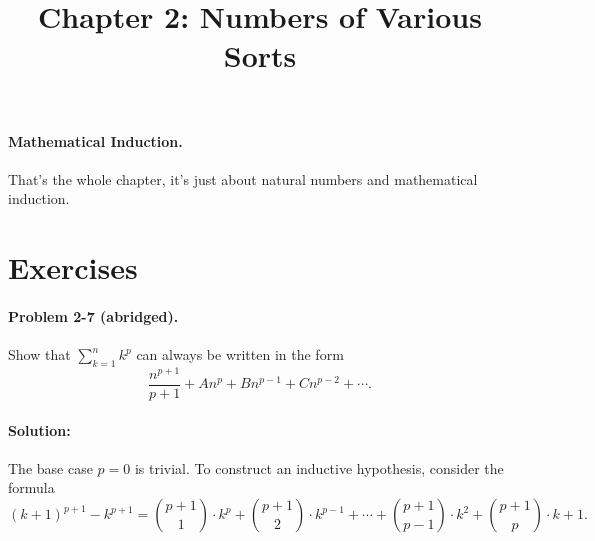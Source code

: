 \documentclass{article}
\begin{document}
\title{Chapter 2: Numbers of Various Sorts}
\maketitle

\paragraph{Mathematical Induction.} That's the whole chapter, it's just about
natural numbers and mathematical induction.

\section*{Exercises}

\paragraph{Problem 2-7 (abridged).} Show that $\sum^n_{k=1} k^p$ can always be
written in the form \begin{equation*}
  \frac{n^{p+1}}{p + 1} + An^p + Bn^{p-1} + Cn^{p-2} + \cdots.
\end{equation*}

\paragraph{Solution:} The base case $p = 0$ is trivial. To construct an
inductive hypothesis, consider the formula \begin{equation*}
  (k + 1)^{p+1} - k^{p+1} = \binom{p+1}{1} \cdot k^p + \binom{p+1}{2} \cdot
  k^{p-1} + \cdots + \binom{p+1}{p-1} \cdot k^2 + \binom{p+1}{p} \cdot k + 1.
\end{equation*}
\end{document}
